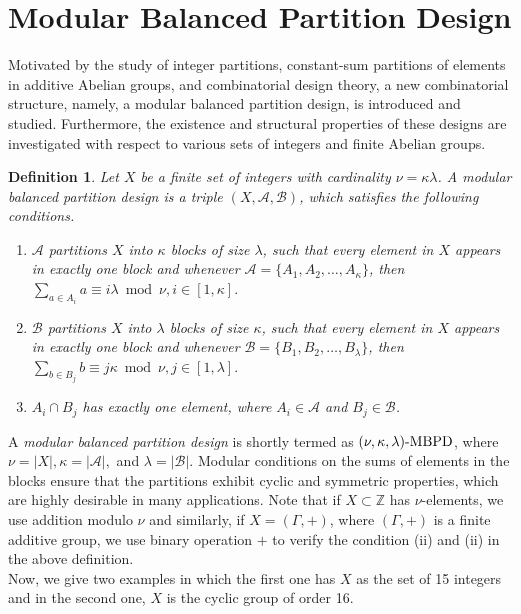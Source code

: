 \documentclass[preprint,11pt]{elsarticle}
\newcommand{\MBPD}{\textnormal{MBPD}}
\newtheorem{definition}[theorem]{Definition}
\begin{document}
\section{Modular Balanced Partition Design} 
Motivated by the study of integer partitions, constant-sum partitions of elements in additive Abelian groups, and combinatorial design theory, a new combinatorial structure, namely, a modular balanced partition design, is introduced and studied. Furthermore, the existence and structural properties of these designs are investigated with respect to various sets of integers and finite Abelian groups.
\begin{definition}\label{def1}
 Let $X$ be a finite set of integers with cardinality $\nu =\kappa \lambda$. A modular balanced partition design is a triple $(X, \mathcal{A}, \mathcal{B})$, which satisfies the following conditions.  
\begin{enumerate}
    \item[$(i)$] $\mathcal{A}$ partitions $X$ into $\kappa$ blocks of size $\lambda$, such that every element in $X$ appears in exactly one block and whenever $\mathcal{A} = \{A_1, A_2, \ldots, A_{\kappa}\}$, then
        \(
        \sum_{a\in A_i} a \equiv i \lambda \bmod{\nu},   i \in [1, \kappa].\)
        \item[$(ii)$] $\mathcal{B}$ partitions $X$ into $\lambda$ blocks of size $\kappa$, such that every element in $X$ appears in exactly one block and whenever $\mathcal{B} = \{B_1, B_2, \ldots, B_{\lambda}\}$, then
        \(
        \sum_{b\in B_j} b \equiv j \kappa \bmod{\nu},  j \in [1, \lambda].\)
       \item[$(iii)$]  $A_i\cap B_j$ has  exactly one element, where $A_i\in \mathcal{A}$ and  $B_j \in \mathcal{B}$. 
\end{enumerate} 
\end{definition}
\noindent A \textit{modular balanced partition design} is shortly termed as ${(\nu,\kappa,\lambda)\text{-}\MBPD}$, where $\nu= |X|, \kappa=|\mathcal{A}|,$ and $\lambda=|\mathcal{B}|$.  Modular conditions on the sums of elements in the blocks ensure that the partitions exhibit cyclic and symmetric properties, which are highly desirable in many applications. Note that if $X\subset \mathbb{Z}$ has $\nu$-elements, we use addition modulo $\nu$ and similarly, if $X=(\Gamma, +)$, where $(\Gamma, +)$ is a finite additive group, we use binary operation $+$ to verify the condition (ii) and (ii) in the above definition. \\
Now, we give two examples in which the first one has $X$ as the set of 15 integers and in the second one,  $X$ is the cyclic group of order 16. 
\end{document}
